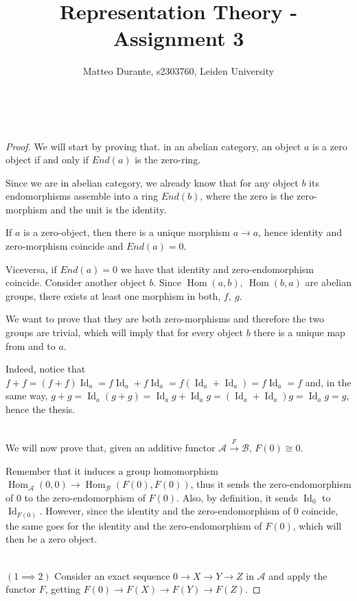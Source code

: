 \documentclass{article}
\newcommand{\exercise}[1]{\noindent {\bf Exercise #1}}
\DeclareMathOperator{\Id}{Id}
\DeclareMathOperator{\Hom}{Hom}
\begin{document}
\title{Representation Theory - Assignment 3}

\author{Matteo Durante, s2303760, Leiden University}

\maketitle


~\\
\exercise{5.7}

\begin{proof}
	We will start by proving that. in an abelian category, an object $a$ is a zero object if and only if $End(a)$ is the zero-ring.
	
	Since we are in abelian category, we already know that for any object $b$ its endomorphisms assemble into a ring $End(b)$, where the zero is the zero-morphism and the unit is the identity.
	
	If $a$ is a zero-object, then there is a unique morphism $a\rightarrow a$, hence identity and zero-morphism coincide and $End(a)=0$.
	
	Viceversa, if $End(a)=0$ we have that identity and zero-endomorphism coincide. Consider another object $b$. Since $\Hom(a,b),\ \Hom(b,a)$ are abelian groups, there exists at least one morphism in both, $f,\ g$.
	
	We want to prove that they are both zero-morphisms and therefore the two groups are trivial, which will imply that for every object $b$ there is a unique map from and to $a$.
	
	Indeed, notice that $f+f=(f+f)\Id_a=f\Id_a+f\Id_a=f(\Id_a+\Id_a)=f\Id_a=f$ and, in the same way, $g+g=\Id_a(g+g)=\Id_ag+\Id_ag=(\Id_a+\Id_a)g=\Id_ag=g$, hence the thesis.
	
	~\\
	We will now prove that, given an additive functor $\mathcal{A}\xrightarrow{F}\mathcal{B}$, $F(0)\cong 0$.
	
	Remember that it induces a group homomorphism $\Hom_{\mathcal{A}}(0,0)\rightarrow \Hom_{\mathcal{B}}(F(0),F(0))$, thus it sends the zero-endomorphism of 0 to the zero-endomorphism of $F(0)$. Also, by definition, it sends $\Id_0$ to $\Id_{F(0)}$. However, since the identity and the zero-endomorphism of 0 coincide, the same goes for the identity and the zero-endomorphism of $F(0)$, which will then be a zero object.
	
	~\\
	
	$(1\implies 2)$ Consider an exact sequence $0\rightarrow X\rightarrow Y\rightarrow Z$ in $\mathcal{A}$ and apply the functor $F$, getting $F(0)\rightarrow F(X)\rightarrow F(Y)\rightarrow F(Z)$.
	

\end{proof}
\end{document}

